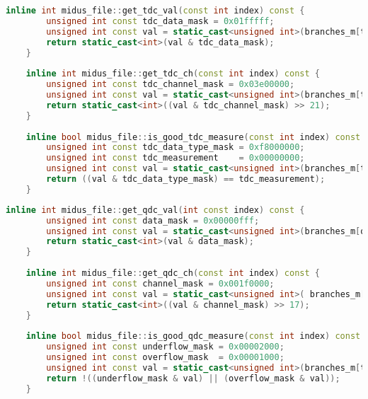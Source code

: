 \documentclass[]{article}
\begin{document}
\begin{center}
	\begin{lstlisting}[caption={Functions used for de-serialising CAEN V1290N \ref{REF FOR THE DATA SHEET} MTDC  output, written in C++}, language=C++, float=htbp]
    inline int midus_file::get_tdc_val(const int index) const {
        unsigned int const tdc_data_mask = 0x01fffff;
        unsigned int const val = static_cast<unsigned int>(branches_m[tdc_i].data[index]);
        return static_cast<int>(val & tdc_data_mask);
    }
    
    inline int midus_file::get_tdc_ch(const int index) const {
        unsigned int const tdc_channel_mask = 0x03e00000;
        unsigned int const val = static_cast<unsigned int>(branches_m[tdc_i].data[index]);
        return static_cast<int>((val & tdc_channel_mask) >> 21);
    }
    
    inline bool midus_file::is_good_tdc_measure(const int index) const {
        unsigned int const tdc_data_type_mask = 0xf8000000;
        unsigned int const tdc_measurement    = 0x00000000;
        unsigned int const val = static_cast<unsigned int>(branches_m[tdc_i].data[index]);
        return ((val & tdc_data_type_mask) == tdc_measurement);
    }
	\end{lstlisting}
\end{center}

\begin{center}
	\begin{lstlisting}[caption={Functions used for de-serialising CAEN V792N \ref{REF FOR THE DATA SHEET} QDC, written in C++}, language=C++, float=htbp]
    inline int midus_file::get_qdc_val(int const index) const {
    	unsigned int const data_mask = 0x00000fff;
    	unsigned int const val = static_cast<unsigned int>(branches_m[qdc_i].data[index]);
    	return static_cast<int>(val & data_mask); 
    }
    
    inline int midus_file::get_qdc_ch(const int index) const {
        unsigned int const channel_mask = 0x001f0000;
        unsigned int const val = static_cast<unsigned int>( branches_m[qdc_i].data[index]);
        return static_cast<int>((val & channel_mask) >> 17);
    }
    
    inline bool midus_file::is_good_qdc_measure(const int index) const {
        unsigned int const underflow_mask = 0x00002000;
        unsigned int const overflow_mask  = 0x00001000;
        unsigned int const val = static_cast<unsigned int>(branches_m[tdc_i].data[index]);
        return !((underflow_mask & val) || (overflow_mask & val));
    }
	\end{lstlisting}

\end{center}



\end{document}
